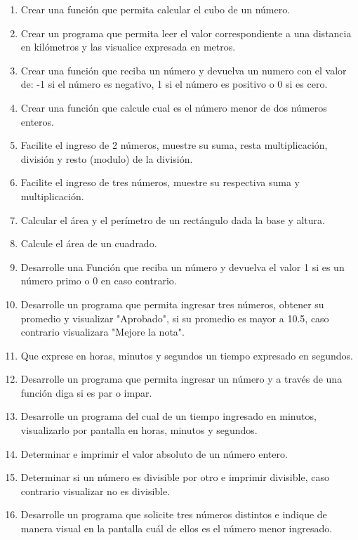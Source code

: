 \documentclass{scrartcl}
\begin{document}
	\begin{enumerate}
		\item Crear una función que permita calcular el cubo de un número.
		\item Crear un programa que permita leer el valor correspondiente a una distancia en kilómetros y las visualice expresada en metros.
		\item Crear una función que reciba un número y devuelva un numero con el valor de: -1 si el número es negativo, 1 si el número es positivo o 0 si es cero.
		\item Crear una función que calcule cual es el número menor de dos números enteros.
		\item Facilite el ingreso de 2 números, muestre su suma, resta multiplicación, división y resto (modulo) de la división.
		\item Facilite el ingreso de tres números, muestre su respectiva suma y		multiplicación.
		\item Calcular el área y el perímetro de un rectángulo dada la base y altura.
		
		\item Calcule el área de un cuadrado.
		\item Desarrolle una Función que reciba un número y devuelva el valor 1 si		es un número primo o 0 en caso contrario.
		
		\item Desarrolle un programa que permita ingresar tres números, obtener su promedio y visualizar "Aprobado", si su promedio es mayor a 10.5, caso contrario visualizara "Mejore la nota".
		\item Que exprese en horas, minutos y segundos un tiempo expresado en segundos.
		\item Desarrolle un programa que permita ingresar un número y a través de una función diga si es par o impar.
		\item Desarrolle un programa del cual de un tiempo ingresado en minutos, visualizarlo por pantalla en horas, minutos y segundos.
		\item Determinar e imprimir el valor absoluto de un número entero.
		\item Determinar si un número es divisible por otro e imprimir divisible, caso contrario visualizar no es divisible.
		\item Desarrolle un programa que solicite tres números distintos e indique		de manera visual en la pantalla cuál de ellos es el número menor ingresado.
	\end{enumerate}
\end{document}
